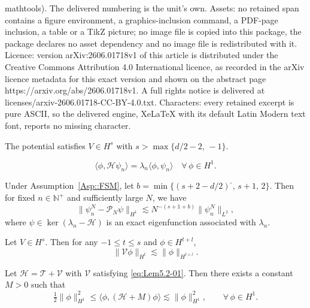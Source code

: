 \documentclass[10pt,a4paper]{amsart}
\newcommand{\m}{\textbf{-}}
\begin{document}
mathtools). The delivered numbering is the unit's own. Assets: no retained span contains a figure environment, a graphics-inclusion command, a PDF-page inclusion, a table or a TikZ picture; no image file is copied into this package, the package declares no asset dependency and no image file is redistributed with it. Licence: version arXiv:2606.01718v1 of this article is distributed under the Creative Commons Attribution 4.0 International licence, as recorded in the arXiv licence metadata for this exact version and shown on the abstract page https://arxiv.org/abs/2606.01718v1. A full rights notice is delivered at licenses/arxiv-2606.01718-CC-BY-4.0.txt. Characters: every retained excerpt is pure ASCII, so the delivered engine, XeLaTeX with its default Latin Modern text font, reports no missing character.
\begin{assumption}\label{Asp::FSM}
The potential satisfies $V \in H^s$ with $s > \max\{d/2-2,\,-1\}$.
\end{assumption}

\begin{equation}
\label{Eq-1.1-02}
\langle \phi, \mathcal{H} \psi_n \rangle = \lambda_n \langle \phi, \psi_n \rangle \quad \forall\, \phi \in H^1.
\end{equation}

\begin{lemma}\label{Lem1.1}
Under Assumption~\ref{Asp::FSM}, let
$
b = \min\{(s+2-d/2)^{\m},\, s+1,\, 2\}.
$
Then for fixed $n \in \mathbb{N}^+$ and sufficiently large $N$, we have 
\begin{equation}
\|\psi_n^N - \mathcal{P}_N \psi\|_{H^1}
\lesssim N^{-(s+1+b)}
\|\psi_n^N\|_{L^2},
\end{equation}
where $\psi \in \operatorname{ker}(\lambda_n - \mathcal{H})$ is an exact eigenfunction associated with $\lambda_n$.
\end{lemma}

\begin{lemma}\label{Lem5.2}
Let $V \in H^s$. Then for any $-1 \leq t \leq s$ and $\phi \in H^{t+l}$,
\begin{equation}\label{eq:Lem5.2-01}
\|\mathcal{V} \phi\|_{H^{t}} \lesssim \|\phi\|_{H^{t+l}}.
\end{equation}
\end{lemma}

\begin{lemma}\label{Lem5.3}
 Let $\mathcal{H}=\mathcal{T}+\mathcal{V}$ with $\mathcal{V}$ satisfying \eqref{eq:Lem5.2-01}. Then there exists a constant $M>0$ such that
\begin{equation}\label{Eq-Lem5.3-01}
\tfrac12\|\phi\|_{H^1}^2 \leq \langle \phi, (\mathcal{H}+M)\phi\rangle \lesssim \|\phi\|_{H^1}^2,\qquad \forall\, \phi \in H^1.
\end{equation}
\end{lemma}
\end{document}
